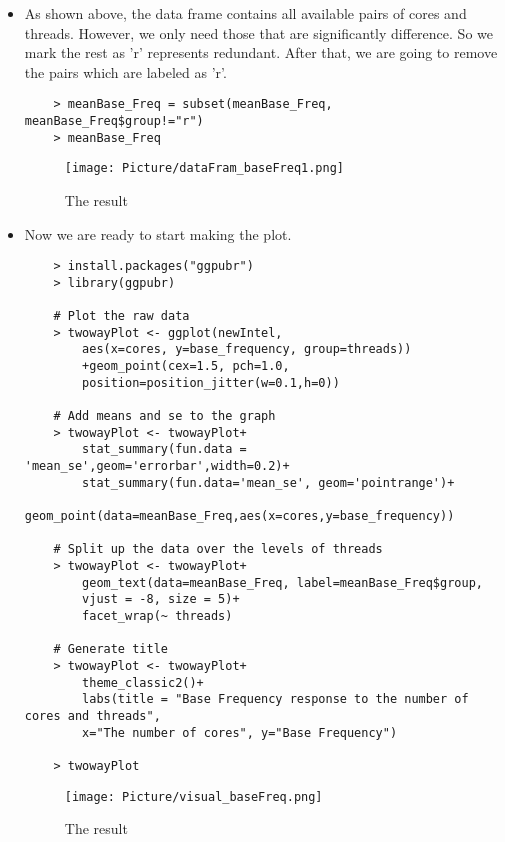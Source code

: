 \documentclass[a4paper]{article}
\begin{document}
\begin{itemize}
    \item[] As shown above, the data frame contains all available pairs of cores and threads. However, we only need those that are significantly difference. So we mark the rest as 'r' represents redundant. After that, we are going to remove the pairs which are labeled as 'r'.
    \begin{lstlisting}
    > meanBase_Freq = subset(meanBase_Freq, meanBase_Freq$group!="r")
    > meanBase_Freq
    \end{lstlisting}
    
    \begin{figure}[H]
        \centering
        \texttt{[image: Picture/dataFram\_baseFreq1.png]}
        \caption{The result}
        \label{7.1.11}
    \end{figure}
    
    \item[] Now we are ready to start making the plot.
    \begin{lstlisting}
    > install.packages("ggpubr")
    > library(ggpubr)
    
    # Plot the raw data
    > twowayPlot <- ggplot(newIntel,
        aes(x=cores, y=base_frequency, group=threads))
        +geom_point(cex=1.5, pch=1.0,
        position=position_jitter(w=0.1,h=0))
    
    # Add means and se to the graph
    > twowayPlot <- twowayPlot+
        stat_summary(fun.data = 'mean_se',geom='errorbar',width=0.2)+
        stat_summary(fun.data='mean_se', geom='pointrange')+
        geom_point(data=meanBase_Freq,aes(x=cores,y=base_frequency))
    
    # Split up the data over the levels of threads
    > twowayPlot <- twowayPlot+
        geom_text(data=meanBase_Freq, label=meanBase_Freq$group, 
        vjust = -8, size = 5)+ 
        facet_wrap(~ threads)
    
    # Generate title
    > twowayPlot <- twowayPlot+
        theme_classic2()+
        labs(title = "Base Frequency response to the number of cores and threads", 
        x="The number of cores", y="Base Frequency")
    
    > twowayPlot
    \end{lstlisting}
    
    \begin{figure}[H]
        \centering
        \texttt{[image: Picture/visual\_baseFreq.png]}
        \caption{The result}
        \label{7.1.11}
    \end{figure}
\end{itemize}
\end{document}
